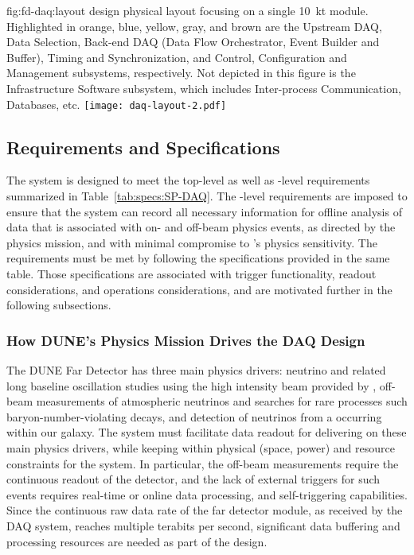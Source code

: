 \begin{dunefigure}{fig:fd-daq:layout}{ design physical
    layout focusing on a single \SI{10}{\kilo\tonne}
    module. Highlighted in orange, blue, yellow, gray, and brown are
    the Upstream DAQ, Data Selection, Back-end DAQ (Data Flow
    Orchestrator, Event Builder and Buffer), Timing and
    Synchronization, and Control,
    Configuration and Management subsystems, respectively. Not depicted in this figure
    is the Infrastructure Software subsystem, which includes Inter-process
    Communication, Databases, etc.
  }
  \texttt{[image: daq-layout-2.pdf]}
\end{dunefigure}


\subsection{Requirements and Specifications}
\label{sec:fd-daq:requirements}

The    system is designed to meet the
 top-level as well as -level requirements
summarized in Table~\ref{tab:specs:SP-DAQ}. The -level requirements are
imposed to ensure that the 
system %
can record all necessary information for offline 
analysis of data that is associated with on- and off-beam physics events, as directed
by the  physics mission, and with minimal compromise to
's physics sensitivity. The requirements must be met by following the 
specifications provided in the same table. Those specifications are
associated with trigger functionality, readout considerations,
and operations considerations, and are motivated further in the following subsections.

\subsubsection{How DUNE's Physics Mission Drives the DAQ Design}

The DUNE Far Detector has three main physics drivers: neutrino  and related
long baseline oscillation studies using the high intensity beam provided
by \fnal, off-beam measurements of atmospheric neutrinos and searches
for rare processes such baryon-number-violating decays,
and detection of neutrinos from a  occurring within our galaxy. The
   system must facilitate data
readout for delivering on these main physics drivers, while keeping
within physical (space, power) and resource constraints for
the system. In particular, the off-beam measurements require the
continuous readout of the detector, and the lack of external triggers for such
events requires real-time or online data processing, and
self-triggering capabilities. Since the
continuous raw data rate of the far detector module, as received by
the DAQ system, reaches multiple
terabits per second, significant data buffering and processing
resources are needed as part of the design.

